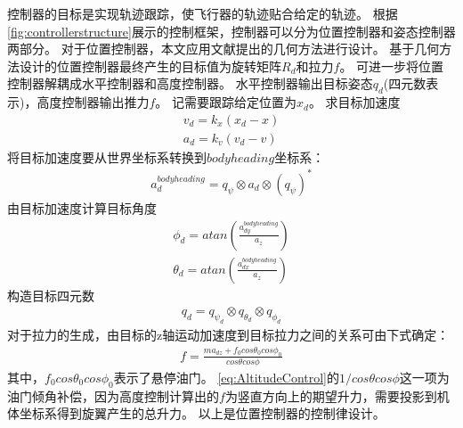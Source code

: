 \documentclass[
  type=master
]{gdutthesis}
\begin{document}

控制器的目标是实现轨迹跟踪，使飞行器的轨迹贴合给定的轨迹。
根据\autoref{fig:controllerstructure}展示的控制框架，控制器可以分为位置控制器和姿态控制器两部分。
对于位置控制器，本文应用文献\parencite{lee2010geometric}提出的几何方法进行设计。
基于几何方法设计的位置控制器最终产生的目标值为旋转矩阵$R_d$和拉力$f$。
可进一步将位置控制器解耦成水平控制器和高度控制器。
水平控制器输出目标姿态$q_d$(四元数表示)，高度控制器输出推力$f$。
记需要跟踪给定位置为$x_d$。
求目标加速度
\begin{gather}
	v_d = k_x (x_d - x)\\
	a_d = k_v (v_d - v)
\end{gather}
将目标加速度要从世界坐标系转换到$bodyheading$坐标系：\vspace{1ex}
\begin{gather}
a_d^{bodyheading} = q_{\psi} \otimes a_d \otimes (q_{\psi})^{*}
\end{gather}
由目标加速度计算目标角度
\begin{gather}
	\phi_d = atan(\frac{a_{dy}^{bodyheading}}{a_z})\\
	\theta_d = atan(\frac{a_{dx}^{bodyheading}}{a_z})
\end{gather}
构造目标四元数
\begin{gather}
	q_d = q_{\psi_d} \otimes q_{\theta_d} \otimes q_{\phi_d}
\end{gather}
对于拉力的生成，由目标的z轴运动加速度到目标拉力之间的关系可由下式确定：\vspace{1ex}
\begin{gather}\label{eq:AltitudeControl}
	f = \frac{ma_{dz} + f_0 cos\theta_0 cos\phi_0}{cos\theta cos\phi}
\end{gather}
其中，$f_0 cos\theta_0 cos\phi_0$表示了悬停油门。
\autoref{eq:AltitudeControl}的$1/cos\theta cos\phi$这一项为油门倾角补偿，因为高度控制计算出的$f$为竖直方向上的期望升力，需要投影到机体坐标系得到旋翼产生的总升力。
以上是位置控制器的控制律设计。
\end{document}
